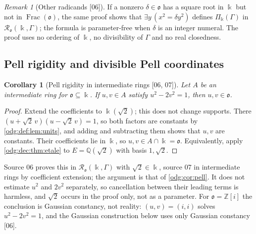 \documentclass[11pt,oneside]{article}
\numberwithin{equation}{section}
\newtheorem{corollary}[corollary]{Corollary}
\theoremstyle{definition}
\theoremstyle{remark}
\newtheorem{remark}[remark]{Remark}
\newcommand{\Z}{\mathbb Z}
\newcommand{\Q}{\mathbb Q}
\newcommand{\Frac}{\operatorname{Frac}}
\newcommand{\src}[1]{\textup{\textsf{\small[#1]}}}
\begin{document}
\begin{remark}[Other radicands \src{06}]\label{odg:def:rem:delta}
If a nonzero $\delta\in\mathfrak o$ has a square root in $\Bbbk$ but not in
$\Frac(\mathfrak o)$, the same proof shows that $\exists y\,(x^2=\delta y^2)$
defines $\Pi_\Bbbk(\Gamma)$ in $\mathcal R_{\mathfrak o}(\Bbbk,\Gamma)$; the
formula is parameter-free when $\delta$ is an integer numeral. The proof uses
no ordering of $\Bbbk$, no divisibility of $\Gamma$ and no real closedness.
\end{remark}

\subsection{Pell rigidity and divisible Pell coordinates}

\begin{corollary}[Pell rigidity in intermediate rings \src{06, 07}]\label{odg:def:cor:pell}
Let $A$ be an intermediate ring for $\mathfrak o\subseteq\Bbbk$. If $u,v\in A$
satisfy $u^2-2v^2=1$, then $u,v\in\mathfrak o$.
\end{corollary}
\begin{proof}
Extend the coefficients to $\Bbbk(\sqrt2)$; this does not change supports. There
$(u+\sqrt2\,v)(u-\sqrt2\,v)=1$, so both factors are constants by
\cref{odg:def:lem:units}, and adding and subtracting them shows that $u,v$
are constants. Their coefficients lie in $\Bbbk$, so $u,v\in A\cap\Bbbk=\mathfrak o$.
Equivalently, apply \cref{odg:dec:thm:etale} to $E=\Q(\sqrt2)$ with basis
$1,\sqrt2$.
\end{proof}

Source 06 proves this in $\mathcal R_{\mathfrak o}(\Bbbk,\Gamma)$ with
$\sqrt2\in\Bbbk$, source 07 in intermediate rings by coefficient extension; the
argument is that of \cref{odg:cor:pell}. It does not estimate $u^2$ and $2v^2$
separately, so cancellation between their leading terms is harmless, and
$\sqrt2$ occurs in the proof only, not as a parameter. For $\mathfrak o=\Z[i]$
the conclusion is Gaussian constancy, not reality: $(u,v)=(i,i)$ solves
$u^2-2v^2=1$, and the Gaussian construction below uses only Gaussian
constancy \src{06}.
\end{document}
